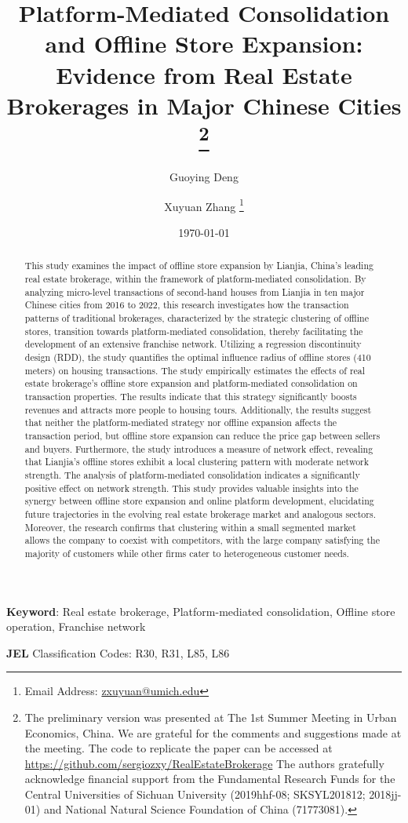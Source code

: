 \documentclass[11pt]{article}
\title{ \vspace*{-2.5cm} \hspace*{-0.5cm}Platform-Mediated Consolidation and Offline Store Expansion: Evidence from Real Estate Brokerages in Major Chinese Cities \footnote{
The preliminary version was presented at The 1st Summer Meeting in Urban Economics, China. We are grateful for the comments and suggestions made at the meeting. The code to replicate the paper can be accessed at \href{https://github.com/sergiozxy/RealEstateBrokerage}{https://github.com/sergiozxy/RealEstateBrokerage} The authors gratefully acknowledge financial support from the Fundamental Research Funds for the Central Universities of Sichuan University (2019hhf-08; SKSYL201812; 2018jj-01) and National Natural Science Foundation of China (71773081). %
}}
\date{ \vspace*{0.5cm} \today}
\begin{document}
\author[1]{Guoying Deng}
\author[2]{Xuyuan Zhang \thanks{Email Address: \href{mailto:zxuyuan@umich.edu}{zxuyuan@umich.edu}}}

\bgroup
\let\footnoterule\relax

\begin{singlespace}
\maketitle

\begin{abstract}
    \noindent This study examines the impact of offline store expansion by Lianjia, China's leading real estate brokerage, within the framework of platform-mediated consolidation. By analyzing micro-level transactions of second-hand houses from Lianjia in ten major Chinese cities from 2016 to 2022, this research investigates how the transaction patterns of traditional brokerages, characterized by the strategic clustering of offline stores, transition towards platform-mediated consolidation, thereby facilitating the development of an extensive franchise network. Utilizing a regression discontinuity design (RDD), the study quantifies the optimal influence radius of offline stores (410 meters) on housing transactions. The study empirically estimates the effects of real estate brokerage's offline store expansion and platform-mediated consolidation on transaction properties. The results indicate that this strategy significantly boosts revenues and attracts more people to housing tours. Additionally, the results suggest that neither the platform-mediated strategy nor offline expansion affects the transaction period, but offline store expansion can reduce the price gap between sellers and buyers. Furthermore, the study introduces a measure of network effect, revealing that Lianjia's offline stores exhibit a local clustering pattern with moderate network strength. The analysis of platform-mediated consolidation indicates a significantly positive effect on network strength. This study provides valuable insights into the synergy between offline store expansion and online platform development, elucidating future trajectories in the evolving real estate brokerage market and analogous sectors. Moreover, the research confirms that clustering within a small segmented market allows the company to coexist with competitors, with the large company satisfying the majority of customers while other firms cater to heterogeneous customer needs.
  \end{abstract}
  
  \textbf{Keyword}: Real estate brokerage, Platform-mediated consolidation, Offline store operation, Franchise network
  
  \textbf{JEL} Classification Codes: R30, R31, L85, L86
\end{singlespace}
\thispagestyle{empty}
\end{document}
